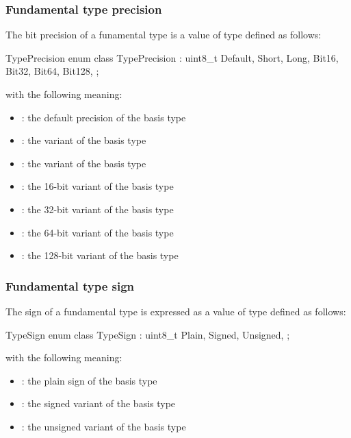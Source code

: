 
\subsubsection{Fundamental type precision}
\label{sec:ifc-fundamental-type-precision}

The bit precision of a funamental type is a value of type  defined as follows:
%
\begin{typedef}{TypePrecision}{}
	enum class TypePrecision : uint8_t {
		Default,
		Short,
		Long,
		Bit16,
		Bit32,
		Bit64,
		Bit128,
	};
\end{typedef}
%
with the following meaning:
\begin{itemize}
  \item {}: the default precision of the basis type
  \item {}: the  variant of the basis type
  \item {}: the  variant of the basis type
  \item {}: the 16-bit variant of the basis type
  \item {}: the 32-bit variant of the basis type
  \item {}: the 64-bit variant of the basis type
  \item {}: the 128-bit variant of the basis type
\end{itemize}


\subsubsection{Fundamental type sign}
\label{sec:ifc-fundamental-type-sign}
The sign of a fundamental type is expressed as a value of type  defined as follows:
%
\begin{typedef}{TypeSign}{}
	enum class TypeSign : uint8_t {
		Plain,
		Signed,
		Unsigned,
	};
\end{typedef}
%
with the following meaning:
\begin{itemize}
  \item {}: the plain sign of the basis type
  \item {}: the signed variant of the basis type
  \item {}: the unsigned variant of the basis type
\end{itemize}


